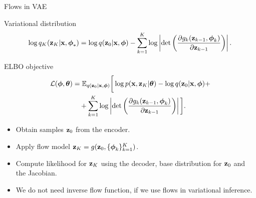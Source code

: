 \begin{frame}{Flows in VAE}
\begin{block}{Variational distribution}
	\vspace{-0.6cm}
	\[
	\log q_K(\mathbf{z}_K | \mathbf{x}, \boldsymbol{\phi}_*) = \log q(\mathbf{z}_0 | \mathbf{x}, \boldsymbol{\phi}) - \sum_{k=1}^K \log \left| \det \left( \frac{\partial g_k(\mathbf{z}_{k - 1}, \boldsymbol{\phi}_k)}{\partial \mathbf{z}_{k-1}} \right) \right|.
	\]
	\vspace{-0.6cm}
\end{block}
\begin{block}{ELBO objective}
	\vspace{-0.7cm}
	\begin{align*}
		\mathcal{L} (\boldsymbol{\phi}, \boldsymbol{\theta}) 
		&= \mathbb{E}_{q(\mathbf{z}_0 | \mathbf{x}, \boldsymbol{\phi})} \bigg[\log p(\mathbf{x}, \mathbf{z}_K | \boldsymbol{\theta}) -  \log q(\mathbf{z}_0 | \mathbf{x}, \boldsymbol{\phi} ) + \\ & \quad  + \sum_{k=1}^K \log \left| \det \left( \frac{\partial g_k(\mathbf{z}_{k - 1}, \boldsymbol{\phi}_k)}{\partial \mathbf{z}_{k-1}} \right) \right| \bigg].
	\end{align*}
	\vspace{-0.5cm}
\end{block}
\begin{itemize}
	\item Obtain samples $\mathbf{z}_0$ from the encoder.
	\item Apply flow model $\mathbf{z}_K = g(\mathbf{z}_0, \{\boldsymbol{\phi}_k\}_{k = 1}^K)$.
	\item Compute likelihood for $\mathbf{z}_K$ using the decoder, base distribution for $\mathbf{z}_0$ and the Jacobian.
	\item We do not need inverse flow function, if we use flows in variational inference.
\end{itemize}
\end{frame}
